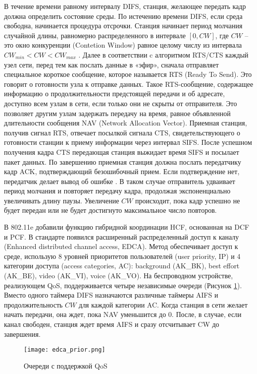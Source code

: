 В течение времени равному интервалу DIFS, станция, желающее передать кадр должна определить состояние среды. По истечению времени DIFS, если среда свободна, начинается процедура отсрочки. Станция начинает период молчания случайной длины, равномерно распределенного в интервале $[0, CW]$, где $CW$ -- это окно конкуренции (Contetion Window) равное целому числу из интервала $CW_{min} < CW < CW_{max}$ \cite{Proletarsky}. Далее в соответствии c алгоритмом RTS/CTS каждый узел сети, перед тем как послать данные в «эфир», сначала отправляет специальное короткое сообщение, которое называется RTS (Ready To Send). Это говорит о готовности узла к отправке данных. Такое RTS-сообщение, содержащее информацию о продолжительности предстоящей передачи и об адресате, доступно всем узлам в сети, если только они не скрыты от отправителя. Это позволяет другим узлам задержать передачу на время, равное объявленной длительности сообщения NAV (Network Allocation Vector). Приемная станция, получив сигнал RTS, отвечает посылкой сигнала CTS, свидетельствующего о готовности станции к приему информации через интервал SIFS. После успешном получения кадра CTS передающая станция выжидает время SIFS и посылает пакет данных. По завершению приемная станция должна послать передатчику кадр ACK, подтверждающий безошибочный прием. Если подтверждение нет, передатчик делает вывод об ошибке \cite{Tanenbaum2022}. В таком случае отправитель удваивает период молчания и повторяет передачу кадра, продолжая экспоненциально увеличивать длину паузы. Увеличение $CW$ происходит, пока кадр успешно не будет передан или не будет достигнуто максимальное число повторов.


В 802.11e добавили функцию гибридной координации HCF, основанная на DCF и PCF. В стандарте появился расширенный распределенный доступ к каналу (Enhanced distributed channel access, EDCA).  Метод обеспечивает доступ к среде, использую 8 уровней приоритетов пользователей (user priority, IP) и 4 категории доступа (access categories, AC): background (AK\_BK), best effort (AK\_BE), video (AK\_VI), voice (AK\_VO). На беспроводном устройстве, реализующем QoS, поддерживается четыре независимые очереди (Рисунок \cref{fig:part1_edca_prior}). Вместо одного таймера DIFS назначаются различные таймеры AIFS и продолжительность $CW$ для каждой категории AC. Когда станция в сети желает начать передачи, она ждет, пока NAV уменьшится до 0. После, в случае, если канал свободен, станция ждет время AIFS и сразу отсчитывает CW до завершения.

\begin{figure}[h!]
  \centering
   \texttt{[image: edca\_prior.png]}
\caption{Очереди с поддержкой QoS}
\label{fig:part1_edca_prior}
\end{figure}



